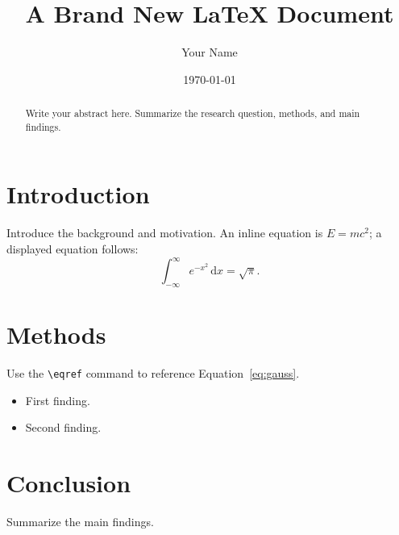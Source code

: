 \documentclass[11pt]{article}
\title{A Brand New \LaTeX{} Document}
\author{Your Name}
\date{\today}
\begin{document}
\maketitle

\begin{abstract}
  Write your abstract here. Summarize the research question, methods, and main findings.
\end{abstract}

\section{Introduction}
Introduce the background and motivation. An inline equation is $E = mc^2$; a displayed equation follows:
\begin{equation}
  \int_{-\infty}^{\infty} e^{-x^{2}}\,\mathrm{d}x = \sqrt{\pi}.
  \label{eq:gauss}
\end{equation}

\section{Methods}
Use the \verb|\eqref| command to reference Equation~\eqref{eq:gauss}.

\begin{itemize}
  \item First finding.
  \item Second finding.
\end{itemize}

\section{Conclusion}
Summarize the main findings.
\end{document}
